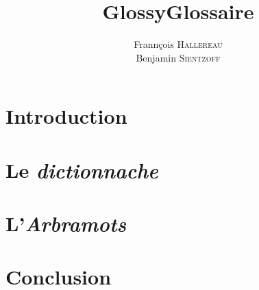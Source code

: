 \documentclass[12pt,a4paper,final]{article}
\author{Frannçois \textsc{Hallereau} \\ Benjamin \textsc{Sientzoff}}
\title{GlossyGlossaire}
\begin{document}
\maketitle

\vspace{5cm}

\tableofcontents

\newpage

\section*{Introduction}

\section{Le \emph{dictionnache}}

\section{L'\emph{Arbramots}}

\section*{Conclusion}
\end{document}
